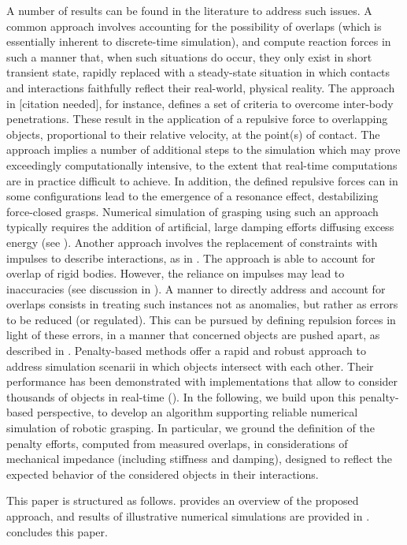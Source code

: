 A number of results can be found in  the literature to address such issues. A common approach involves accounting for the possibility of overlaps (which is essentially inherent to discrete-time simulation), and compute reaction forces in such a manner that, when such situations do occur, they only exist in short transient state, rapidly replaced with a steady-state situation in which contacts and interactions faithfully reflect their real-world, physical reality. The approach in [citation needed], for instance, defines a set of criteria to overcome inter-body penetrations. These result in the application of a repulsive force to overlapping objects, proportional to their relative velocity, at the point(s) of contact. The approach implies a number of additional steps to the simulation which may prove exceedingly computationally intensive, to the extent that real-time computations are in practice difficult to achieve. In addition, the defined repulsive forces can in some configurations lead to the emergence of a resonance effect, destabilizing force-closed grasps. Numerical simulation of grasping using such an approach typically requires the addition of artificial, large damping efforts diffusing excess energy (see \cite{engine_simulation}). Another approach involves the replacement of constraints with impulses to describe interactions, as in \cite{impulse_based}. The approach is able to account for overlap of rigid bodies. However, the reliance on impulses may lead to inaccuracies (see discussion in \cite{impulse_based}). A manner to directly address and account for overlaps consists in treating such instances not as anomalies, but rather as errors to be reduced (or regulated). This can be pursued by defining repulsion forces in light of these errors, in a manner that concerned objects are pushed apart, as described in \cite{drumwright_penalty_based}. Penalty-based methods offer a rapid and robust approach to address simulation scenarii in which objects intersect with each other. Their performance has been demonstrated with implementations that allow to consider thousands of objects in real-time (\cite{fast_penalty_based,drumwright_fast_penalty}). In the following, we build upon this penalty-based perspective, to develop an algorithm supporting reliable numerical simulation of robotic grasping. In particular, we ground the definition of the penalty efforts, computed from measured overlaps, in considerations of mechanical impedance (including stiffness and damping), designed to reflect the expected behavior of the considered objects in their interactions.

This paper is structured as follows.  provides an overview of the proposed approach, and results of illustrative numerical simulations are provided in .  concludes this paper. 